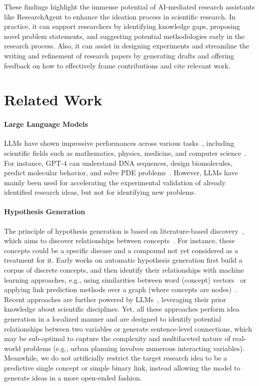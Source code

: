 \documentclass[11pt]{article}
\begin{document}
These findings highlight the immense potential of AI-mediated research assistants like ResearchAgent to enhance the ideation process in scientific research. In practice, it can support researchers by identifying knowledge gaps, proposing novel problem statements, and suggesting potential methodologies early in the research process. Also, it can assist in designing experiments and streamline the writing and refinement of research papers by generating drafts and offering feedback on how to effectively frame contributions and cite relevant work.



\section{Related Work}
\label{sec:relatedwork}

\paragraph{Large Language Models}
LLMs have shown impressive performances across various tasks~\cite{GPT-4, Gemini}, including scientific fields such as mathematics, physics, medicine, and computer science~\cite{author/discovery, MathematicalLLM, LLM/discovery/2, Airesearchagent, idea/co-creation}. For instance, GPT-4 can understand DNA sequences, design biomolecules, predict molecular behavior, and solve PDE problems~\cite{LLM/discovery/1}. However, LLMs have mainly been used for accelerating the experimental validation of already identified research ideas, but not for identifying new problems. 

\paragraph{Hypothesis Generation}
The principle of hypothesis generation is based on literature-based discovery~\cite{LBD}, which aims to discover relationships between concepts~\cite{Henry2017LiteratureBD}. For instance, these concepts could be a specific disease and a compound not yet considered as a treatment for it. Early works on automatic hypothesis generation first build a corpus of discrete concepts, and then identify their relationships with machine learning approaches, e.g., using similarities between word (concept) vectors~\cite{hypothesis/wordvector} or applying link prediction methods over a graph (where concepts are nodes)~\cite{hypothesis/graph/1, hypothesis/graph/2}. Recent approaches are further powered by LLMs~\cite{CLBD, zeroshot/hypothesis, tomato}, leveraging their prior knowledge about scientific disciplines. Yet, all these approaches perform idea generation in a localized manner and are designed to identify potential relationships between two variables or generate sentence-level connections, which may be sub-optimal to capture the complexity and multifaceted nature of real-world problems (e.g., urban planning involves numerous interacting variables). Meanwhile, we do not artificially restrict the target research idea to be a predictive single concept or simple binary link, instead allowing the model to generate ideas in a more open-ended fashion.
\end{document}
